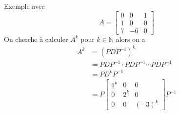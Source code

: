 \documentclass[11pt,colorlinks]{book}
\theoremstyle{mytheoremstyle}
\theoremstyle{mytheoremstyle}
\theoremstyle{mytheoremstyle}
\theoremstyle{mytheoremstyle}
\theoremstyle{mytheoremstyle}
\theoremstyle{mytheoremstyle}
\theoremstyle{mytheoremstyle}
\theoremstyle{mytheoremstyle}
\theoremstyle{myproblemstyle}
\def\mbb#1{\mathbb{#1}}
\def\bN{\mbb{N}}
\begin{document}
\begin{ex}
  Exemple avec 
  \begin{equation*}
    A = \begin{bmatrix}
      0 & 0 & 1 \\ 
      1 & 0 & 0 \\ 
      7 & -6 & 0 
    \end{bmatrix}
  \end{equation*}
  On cherche à calculer $A^k$ pour $k \in \bN$ alors on a 
  \begin{align*}
    A^k &= (PDP^{-1})^k \\ 
    &= PDP^{-1} \cdot PDP^{-1} \cdots PDP^{-1} \\ 
    &= PD^kP^{-1} \\ 
    &= P\begin{bmatrix}
      1^k & 0 & 0 \\ 
      0 & 2^k & 0 \\ 
      0 & 0 & (-3)^k
    \end{bmatrix}P^{-1}
  \end{align*}
\end{ex}
\end{document}
